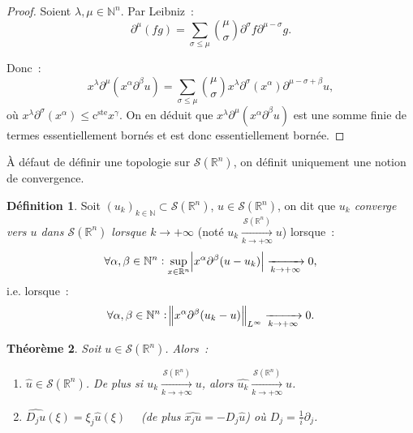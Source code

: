 \documentclass{report}
\newcommand{\R}{{\mathbb R}}
\newcommand{\N}{{\mathbb N}}
\newcommand{\pinfty}{{+\infty}}
\newcommand{\cste}{\text{c}^{\text{ste}}}
\newtheorem{thm}{Théorème}[chapter]
\theoremstyle{definition}
\newtheorem{déf}[thm]{Définition}
\theoremstyle{remark}
\begin{document}
\begin{proof} Soient $\lambda, \mu \in \N^n$. Par Leibniz~:
\[\partial^\mu(fg) = \sum_{\sigma \leq \mu}\binom \mu\sigma\partial^\sigma f \partial^{\mu-\sigma} g.\]

Donc~:
\[x^\lambda\partial^\mu(x^\alpha\partial^\beta u) = \sum_{\sigma \leq \mu}\binom \mu\sigma x^\lambda\partial^\sigma(x^\alpha)\partial^{\mu-\sigma+\beta}u,\]
où $x^\lambda\partial^\sigma(x^\alpha) \leq \cste x^\gamma$. On en déduit que $x^\lambda\partial^\mu(x^\alpha\partial^\beta u)$ est une somme finie de termes
essentiellement bornés et est donc essentiellement bornée.
\end{proof}

À défaut de définir une topologie sur $\mathcal S(\R^n)$, on définit uniquement une notion de convergence.

\begin{déf}\label{déf:convergence Schwartz} Soit $(u_k)_{k \in \N} \subset \mathcal S(\R^n)$, $u \in \mathcal S(\R^n)$, on dit que \textit{$u_k$ converge vers $u$ dans
$\mathcal S(\R^n)$ lorsque $k \to \pinfty$} (noté $u_k \xrightarrow[k \to \pinfty]{\mathcal S(\R^n)} u$) lorsque~:
\[\forall \alpha, \beta \in \N^n : \sup_{x \in \R^n}\abs {x^\alpha\partial^\beta(u-u_k)} \xrightarrow[k \to \pinfty]{} 0,\]
i.e. lorsque~:
\[\forall \alpha, \beta \in \N^n : \norm {x^\alpha\partial^\beta(u_k-u)}_{L^\infty} \xrightarrow[k \to \pinfty]{} 0.\]
\end{déf}

\begin{thm}\label{thm:Fourier continu sur Schwartz} Soit $u \in \mathcal S(\R^n)$. Alors~:
\begin{enumerate}
	\item $\hat u \in \mathcal S(\R^n)$. De plus si $u_k \xrightarrow[k \to \pinfty]{\mathcal S(\R^n)} u$, alors $\widehat {u_k} \xrightarrow[k \to \pinfty]{\mathcal S(\R^n)} \hat u$.
	\item $\widehat {D_ju}(\xi) = \xi_j\hat u(\xi)\quad$ (de plus $\widehat {x_ju} = -D_j \hat u$) où $D_j = \frac 1i\partial_j$.
\end{enumerate}
\end{thm}
\end{document}
